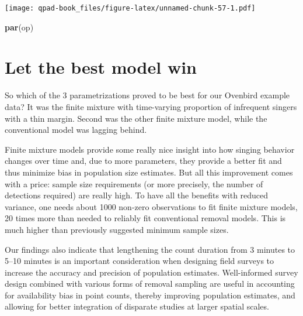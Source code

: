 \documentclass[12pt,]{book}
\newenvironment{Shaded}{\begin{snugshade}}{\end{snugshade}}
\newcommand{\KeywordTok}[1]{\textcolor[rgb]{0.13,0.29,0.53}{\textbf{#1}}}
\newcommand{\NormalTok}[1]{#1}
\newcommand{\OperatorTok}[1]{\textcolor[rgb]{0.81,0.36,0.00}{\textbf{#1}}}
\newcommand{\StringTok}[1]{\textcolor[rgb]{0.31,0.60,0.02}{#1}}
\begin{document}
\texttt{[image: qpad-book\_files/figure-latex/unnamed-chunk-57-1.pdf]}

\begin{Shaded}
\begin{Highlighting}[]
\KeywordTok{par}\NormalTok{(op)}
\end{Highlighting}
\end{Shaded}

\hypertarget{let-the-best-model-win}{%
\section{Let the best model win}\label{let-the-best-model-win}}

So which of the 3 parametrizations proved to be best for our Ovenbird example data? It was the finite mixture with time-varying proportion of infrequent singers with a thin margin. Second was the other finite mixture model, while the conventional model was lagging behind.

\begin{Shaded}
\end{Shaded}

Finite mixture models provide some really nice insight into how singing behavior changes over time and, due to more parameters, they provide a better fit and thus minimize bias in population size estimates. But all this improvement comes with a price: sample size requirements (or more precisely, the number of detections required) are really high. To have all the benefits with reduced variance, one needs about 1000 non-zero observations to fit finite mixture models, 20 times more than needed to reliably fit conventional removal models. This is much higher than previously suggested minimum sample sizes.

Our findings also indicate that lengthening the count duration from 3 minutes to 5--10 minutes is an important consideration when designing field surveys to increase the accuracy and precision of population estimates. Well-informed survey design combined with various forms of removal sampling are useful in accounting for availability bias in point counts, thereby improving population estimates, and allowing for better integration of disparate studies at larger spatial scales.
\end{document}
